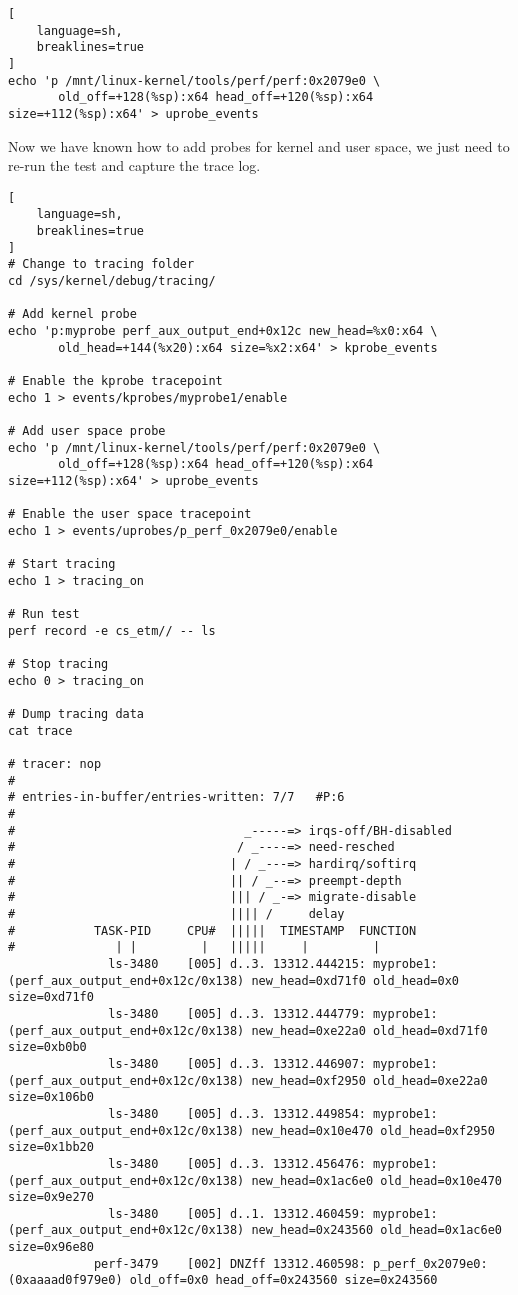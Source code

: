 \documentclass[11pt]{diazessay} %
\begin{document}
\begin{lstlisting}[
  	language=sh,
	breaklines=true
]
echo 'p /mnt/linux-kernel/tools/perf/perf:0x2079e0 \
       old_off=+128(%sp):x64 head_off=+120(%sp):x64 size=+112(%sp):x64' > uprobe_events
\end{lstlisting}

Now we have known how to add probes for kernel and user space, we just need to
re-run the test and capture the trace log.

\begin{lstlisting}[
  	language=sh,
	breaklines=true
]
# Change to tracing folder
cd /sys/kernel/debug/tracing/

# Add kernel probe
echo 'p:myprobe perf_aux_output_end+0x12c new_head=%x0:x64 \
       old_head=+144(%x20):x64 size=%x2:x64' > kprobe_events

# Enable the kprobe tracepoint
echo 1 > events/kprobes/myprobe1/enable

# Add user space probe
echo 'p /mnt/linux-kernel/tools/perf/perf:0x2079e0 \
       old_off=+128(%sp):x64 head_off=+120(%sp):x64 size=+112(%sp):x64' > uprobe_events

# Enable the user space tracepoint
echo 1 > events/uprobes/p_perf_0x2079e0/enable

# Start tracing
echo 1 > tracing_on

# Run test
perf record -e cs_etm// -- ls

# Stop tracing
echo 0 > tracing_on

# Dump tracing data
cat trace

# tracer: nop
#
# entries-in-buffer/entries-written: 7/7   #P:6
#
#                                _-----=> irqs-off/BH-disabled
#                               / _----=> need-resched
#                              | / _---=> hardirq/softirq
#                              || / _--=> preempt-depth
#                              ||| / _-=> migrate-disable
#                              |||| /     delay
#           TASK-PID     CPU#  |||||  TIMESTAMP  FUNCTION
#              | |         |   |||||     |         |
              ls-3480    [005] d..3. 13312.444215: myprobe1: (perf_aux_output_end+0x12c/0x138) new_head=0xd71f0 old_head=0x0 size=0xd71f0
              ls-3480    [005] d..3. 13312.444779: myprobe1: (perf_aux_output_end+0x12c/0x138) new_head=0xe22a0 old_head=0xd71f0 size=0xb0b0
              ls-3480    [005] d..3. 13312.446907: myprobe1: (perf_aux_output_end+0x12c/0x138) new_head=0xf2950 old_head=0xe22a0 size=0x106b0
              ls-3480    [005] d..3. 13312.449854: myprobe1: (perf_aux_output_end+0x12c/0x138) new_head=0x10e470 old_head=0xf2950 size=0x1bb20
              ls-3480    [005] d..3. 13312.456476: myprobe1: (perf_aux_output_end+0x12c/0x138) new_head=0x1ac6e0 old_head=0x10e470 size=0x9e270
              ls-3480    [005] d..1. 13312.460459: myprobe1: (perf_aux_output_end+0x12c/0x138) new_head=0x243560 old_head=0x1ac6e0 size=0x96e80
            perf-3479    [002] DNZff 13312.460598: p_perf_0x2079e0: (0xaaaad0f979e0) old_off=0x0 head_off=0x243560 size=0x243560
\end{lstlisting}
\end{document}
